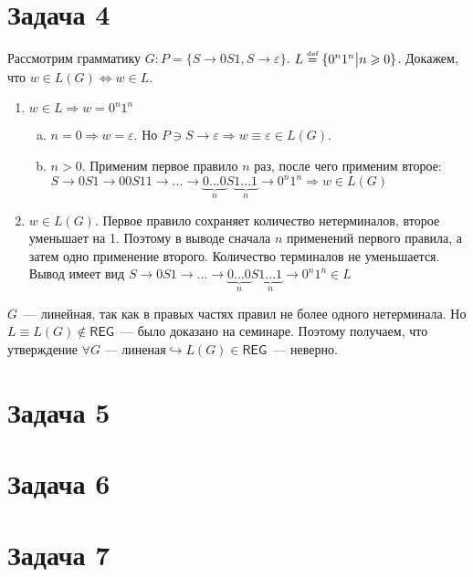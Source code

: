 \documentclass[a4paper]{article}
\def\REG{{\mathsf{REG}}}
\def\eqdef{\overset{\mbox{\tiny def}}{=}}
\begin{document}
\section*{Задача 4}
Рассмотрим грамматику $G\colon P=\{S\longrightarrow 0S1,S\longrightarrow \varepsilon\}$. $L\eqdef\{0^n1^n\big| n\geqslant 0\}$. Докажем, что $w\in L(G)\Leftrightarrow w\in L$.
\begin{enumerate}
\item $w\in L\Rightarrow w=0^n1^n$\begin{enumerate}[a.]
\item $n=0\Rightarrow w=\varepsilon$. Но $P\ni S\longrightarrow \varepsilon\Rightarrow w\equiv\varepsilon\in L(G)$.
\item $n>0$. Применим первое правило $n$ раз, после чего применим второе: $S\longrightarrow 0S1\longrightarrow 00S11\longrightarrow...\longrightarrow \underbrace{0...0}_{n}S\underbrace{1...1}_n\longrightarrow 0^n1^n\Rightarrow w\in L(G)$
\end{enumerate}
\item $w\in L(G)$. Первое правило сохраняет количество нетерминалов, второе уменьшает на 1. Поэтому в выводе сначала $n$ применений первого правила, а затем одно применение второго. Количество терминалов не уменьшается. Вывод имеет вид $S\longrightarrow 0S1\longrightarrow...\longrightarrow \underbrace{0...0}_nS\underbrace{1...1}_n\longrightarrow 0^n1^n\in L$
\end{enumerate}
$G$~--- линейная, так как в правых частях правил не более одного нетерминала. Но $L\equiv L(G)\notin\REG$~--- было доказано на семинаре. Поэтому получаем, что утверждение $\forall G\mbox{~--- линеная}\hookrightarrow L(G)\in\REG$~--- неверно.
\section*{Задача 5}
\section*{Задача 6}
\section*{Задача 7}
\end{document}
